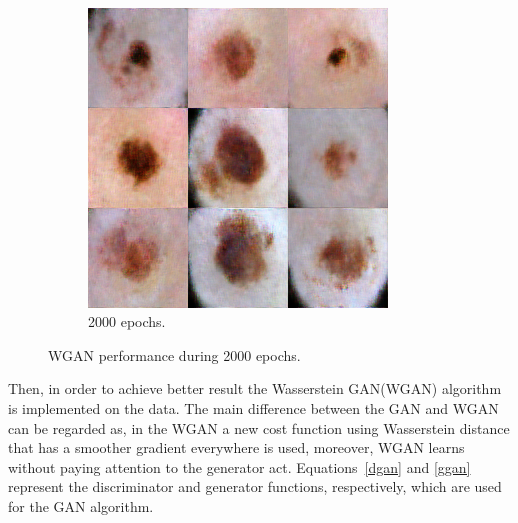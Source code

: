 \documentclass[conference]{IEEEtran}
\begin{document}
\begin{figure}
   ~
    \begin{subfigure}[b]{0.15\textwidth}
        \includegraphics[width=\textwidth]{13.png}
        \caption{2000 epochs.}
        \label{fig:9}
    \end{subfigure}
  
    
    \caption{WGAN performance during 2000 epochs.}\label{fig:GANR}
\end{figure}























 Then, in order to achieve better result the Wasserstein GAN(WGAN) algorithm is implemented on the data. The main difference between the GAN and WGAN can be regarded as, in the WGAN a new cost function using Wasserstein distance that has a smoother gradient everywhere is used, moreover, WGAN learns without paying attention to the generator act. Equations~\ref{dgan} and \ref{ggan} represent the discriminator and generator functions, respectively, which are used for the GAN algorithm. 
\end{document}
